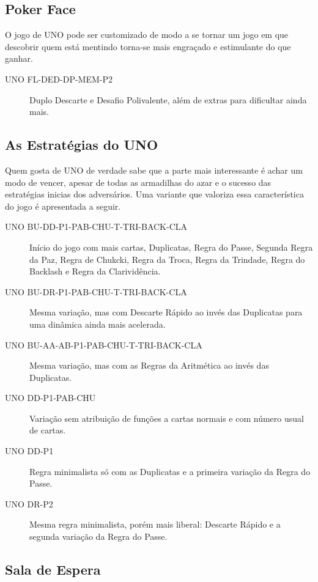 \subsection{Poker Face}

O jogo de UNO pode ser customizado de modo a se tornar um jogo em que descobrir quem está mentindo torna-se mais engraçado e estimulante do que ganhar.

\begin{description}
\item[UNO FL-DED-DP-MEM-P2]{Duplo Descarte e Desafio Polivalente, além de extras para dificultar ainda mais.}
\end{description}

\subsection{As Estratégias do UNO}

Quem gosta de UNO de verdade sabe que a parte mais interessante é achar um modo de vencer, apesar de todas as armadilhas do azar e o sucesso das estratégias inicias dos adversários. Uma variante que valoriza essa característica do jogo é apresentada a seguir.

\begin{description}
\item[UNO BU-DD-P1-PAB-CHU-T-TRI-BACK-CLA]{Início do jogo com mais cartas, Duplicatas, Regra do Passe, Segunda Regra da Paz, Regra de Chukcki, Regra da Troca, Regra da Trindade, Regra do Backlash e Regra  da Clarividência.}
\item[UNO BU-DR-P1-PAB-CHU-T-TRI-BACK-CLA]{Mesma variação, mas com Descarte Rápido ao invés das Duplicatas para uma dinâmica ainda mais acelerada.}
\item[UNO BU-AA-AB-P1-PAB-CHU-T-TRI-BACK-CLA]{Mesma variação, mas com as Regras da Aritmética ao invés das Duplicatas.}
\item[UNO DD-P1-PAB-CHU]{Variação sem atribuição de funções a cartas normais e com número usual de cartas.}
\item[UNO DD-P1]{Regra minimalista só com as Duplicatas e a primeira variação da Regra do Passe.}
\item[UNO DR-P2]{Mesma regra minimalista, porém mais liberal: Descarte Rápido e a segunda variação da Regra do Passe.}
\end{description}

\subsection{Sala de Espera}

